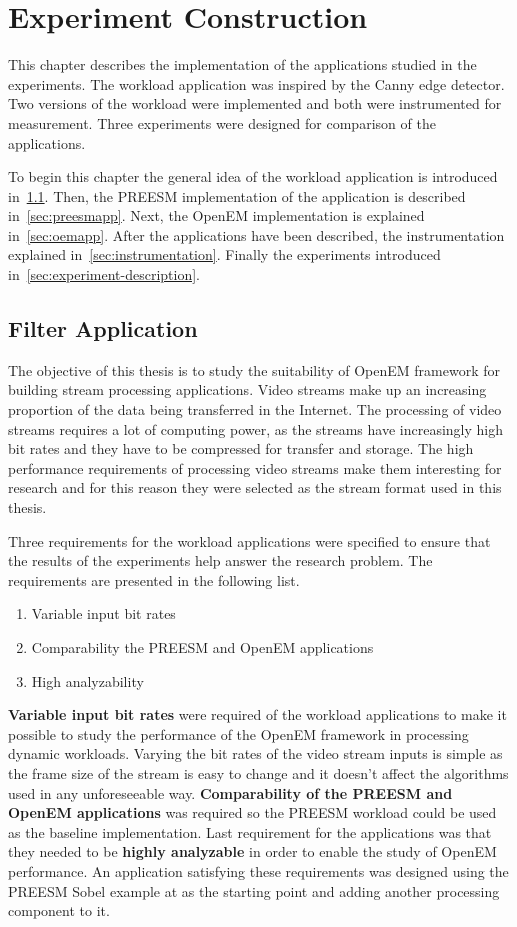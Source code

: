 \chapter{Experiment Construction}
\label{chapter:construction}
This chapter describes the implementation of the applications studied in the experiments. The workload application was inspired by the Canny edge detector. Two versions of the workload were implemented and both were instrumented for measurement. Three experiments were designed for comparison of the applications.

To begin this chapter the general idea of the workload application is introduced in~\ref{sec:filterapp}. Then, the PREESM implementation of the application is described in~\ref{sec:preesmapp}. Next, the OpenEM implementation is explained in~\ref{sec:oemapp}. After the applications have been described, the instrumentation explained in~\ref{sec:instrumentation}. Finally the experiments introduced in~\ref{sec:experiment-description}.

\section{Filter Application}
\label{sec:filterapp}
The objective of this thesis is to study the suitability of OpenEM framework for building stream processing applications. Video streams make up an increasing proportion of the data being transferred in the Internet. The processing of video streams requires a lot of computing power, as the streams have increasingly high bit rates and they have to be compressed for transfer and storage. The high performance requirements of processing video streams make them interesting for research and for this reason they were selected as the stream format used in this thesis.

Three requirements for the workload applications were specified to ensure that the results of the experiments help answer the research problem. The requirements are presented in the following list.

\begin{enumerate}
    \item{Variable input bit rates}
    \item{Comparability the PREESM and OpenEM applications}
    \item{High analyzability}
\end{enumerate}

\textbf{Variable input bit rates} were required of the workload applications to make it possible to study the performance of the OpenEM framework in processing dynamic workloads. Varying the bit rates of the video stream inputs is simple as the frame size of the stream is easy to change and it doesn't affect the algorithms used in any unforeseeable way. \textbf{Comparability of the PREESM and OpenEM applications} was required so the PREESM workload could be used as the baseline implementation. Last requirement for the applications was that they needed to be \textbf{highly analyzable} in order to enable the study of OpenEM performance. An application satisfying these requirements was designed using the PREESM Sobel example at \cite{preesmtut} as the starting point and adding another processing component to it.

